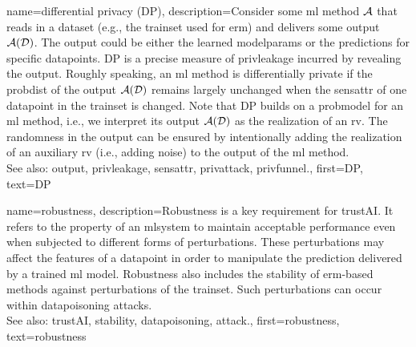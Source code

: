 {name={differential privacy (DP)},
	description={Consider some \gls{ml} method $\mathcal{A}$ 
  		that reads in a \gls{dataset} (e.g., the \gls{trainset} 
  		used for \gls{erm}) and delivers some \gls{output} $\mathcal{A}(\mathcal{D})$. The \gls{output} 
  		could be either the learned \glspl{modelparam} or the \glspl{prediction} for specific \glspl{datapoint}. 
  		DP is a precise \gls{measure} of \gls{privleakage} incurred by revealing the 
  		\gls{output}. Roughly speaking, an \gls{ml} method is differentially private if the \gls{probdist} 
  		of the \gls{output} $\mathcal{A}(\mathcal{D})$ remains largely unchanged when the \gls{sensattr} 
  		of one \gls{datapoint} in the \gls{trainset} is changed. Note that DP 
  		builds on a \gls{probmodel} for an \gls{ml} method, i.e., we interpret its \gls{output} $\mathcal{A}(\mathcal{D})$ 
  		as the \gls{realization} of an \gls{rv}. The randomness in the \gls{output} can be ensured 
  		by intentionally adding the \gls{realization} of an auxiliary \gls{rv} (i.e., adding noise) to 
  		the \gls{output} of the \gls{ml} method.
				\\ 
		See also: \gls{output}, \gls{privleakage}, \gls{sensattr}, \gls{privattack}, \gls{privfunnel}.}, 
  	first={DP}, 
  	text={DP} 
}

{name={robustness},
	description={Robustness is a key requirement for \gls{trustAI}. It
		refers to the property of an \gls{mlsystem} to maintain acceptable performance even when 
		subjected to different forms of perturbations. These perturbations may affect the \glspl{feature} 
		of a \gls{datapoint} in order to manipulate the \gls{prediction} delivered by a trained \gls{ml} \gls{model}. 
		Robustness also includes the \gls{stability} of \gls{erm}-based methods against perturbations 
		of the \gls{trainset}. Such perturbations can occur within \gls{datapoisoning} \glspl{attack}. 
		\\ 
		See also: \gls{trustAI}, \gls{stability}, \gls{datapoisoning}, \gls{attack}.}, 
	first={robustness}, 
	text={robustness} 
}

